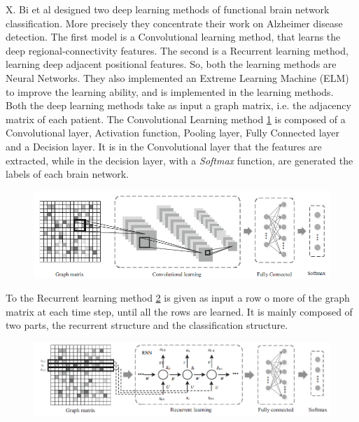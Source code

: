 X. Bi et al \cite{Bi2019FunctionalBN} designed two deep learning methods of functional brain network classification. More precisely they concentrate their work on Alzheimer disease detection. The first model is a Convolutional learning method, that learns the deep regional-connectivity features. The second is a Recurrent learning method, learning deep adjacent positional features. So, both the learning methods are Neural Networks. They also implemented an Extreme Learning Machine (ELM) to improve the learning ability, and is implemented in the learning methods.
\\

Both the deep learning methods take as input a graph matrix, i.e. the adjacency matrix of each patient. 
The Convolutional Learning method \ref{fig:diagram8} is composed of a Convolutional layer, Activation function, Pooling layer, Fully Connected layer and a Decision layer. It is in the Convolutional layer that the features are extracted, while in the decision layer, with a \textit{Softmax} function, are generated the labels of each brain network.

\begin{figure}[htbp]
	\centering
	\includegraphics[scale=0.5]{Immagini/functional1.PNG}
	\caption{\label{fig:diagram8}}
\end{figure}

To the Recurrent learning method \ref{fig:diagram9} is given as input a row o more of the graph matrix at each time step, until all the rows are learned. It is mainly composed of two parts, the recurrent structure and the classification structure. 

\begin{figure}[htbp]
	\centering
	\includegraphics[scale=0.5]{Immagini/functional2.PNG}
	\caption{\label{fig:diagram9}}
\end{figure}

